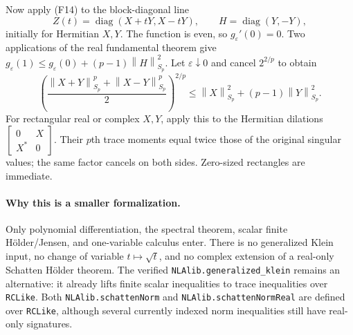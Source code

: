 \documentclass[11pt,a4paper]{article}
\newcommand{\norm}[1]{\left\lVert#1\right\rVert}
\DeclareMathOperator{\diag}{diag}
\DeclareRobustCommand{\code}[1]{{\footnotesize\urlstyle{tt}\nolinkurl{#1}}}
\begin{document}
Now apply (F14) to the block-diagonal line
\[
 Z(t)=\diag(X+tY,X-tY),\qquad H=\diag(Y,-Y),
\]
initially for Hermitian $X,Y$. The function is even, so
$g_\varepsilon'(0)=0$. Two applications of the real fundamental theorem
give $g_\varepsilon(1)\le g_\varepsilon(0)+(p-1)\norm H_{S_p}^2$.
Let $\varepsilon\downarrow0$ and cancel $2^{2/p}$ to obtain
\[
 \left(\frac{\norm{X+Y}_{S_p}^p+\norm{X-Y}_{S_p}^p}{2}\right)^{2/p}
 \le\norm X_{S_p}^2+(p-1)\norm Y_{S_p}^2.                      \tag{F15}
\]
For rectangular real or complex $X,Y$, apply this to the Hermitian
dilations $\left[\begin{smallmatrix}0&X\\X^*&0\end{smallmatrix}\right]$.
Their $p$th trace moments equal twice those of the original singular values;
the same factor cancels on both sides. Zero-sized rectangles are immediate.

\paragraph{Why this is a smaller formalization.}
Only polynomial differentiation, the spectral theorem, scalar finite
H\"older/Jensen, and one-variable calculus enter. There is no generalized
Klein input, no change of variable $t\mapsto\sqrt t$, and no complex
extension of a real-only Schatten H\"older theorem. The verified
\code{NLAlib.generalized_klein} remains an alternative: it already lifts
finite scalar inequalities to trace inequalities over \code{RCLike}.
Both \code{NLAlib.schattenNorm} and \code{NLAlib.schattenNormReal} are
defined over \code{RCLike}, although several currently indexed norm
inequalities still have real-only signatures.
\end{document}
